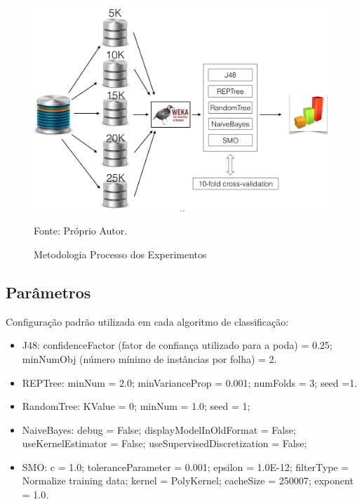 \documentclass[
	12pt,				%
	openright,			%
	oneside,	
	a4paper,				%
	english,				%
	brazil				%
]{abntex2/abntex2} %
\begin{document}
	
	\begin{figure}[!htb]
		\caption{\label{figmetodologiaExperimentos} \fontsize{10}{\baselineskip} \selectfont Metodologia Processo dos Experimentos}
		\begin{center}
			\includegraphics[scale=0.55]{img/metodologiaExperimentos.png}
		\end{center}
		{\fontsize{10}{\baselineskip} \selectfont Fonte: Próprio Autor.}
	\end{figure}
	
	\subsection{Parâmetros }
	Configuração padrão utilizada em cada algoritmo de classificação:
	
	\begin{itemize}
		\item J48: confidenceFactor  (fator de confiança utilizado para a poda) = 0.25; minNumObj (número mínimo de instâncias por folha) = 2.
		\item REPTree: minNum = 2.0; minVarianceProp = 0.001; numFolds = 3; seed =1.
		\item RandomTree: KValue = 0; minNum = 1.0; seed = 1;
		\item NaiveBayes: debug = False; displayModelInOldFormat = False; useKernelEstimator = False; useSupervisedDiscretization = False;
		\item SMO: c = 1.0; toleranceParameter = 0.001; epsilon = 1.0E-12; filterType = Normalize training data; kernel = PolyKernel; cacheSize = 250007; exponent = 1.0.
	\end{itemize}
	
\end{document}

